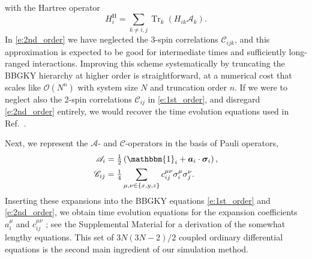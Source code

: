 \documentclass[aps,prl,showpacs,amsmath,amssymb,superscriptaddress,reprint,10pt]{revtex4-1}
\newcommand\id{{\mathbbm{1}}}
\newcommand{\mvec}[1]{\boldsymbol #1}
\DeclareMathOperator{\Tr}{{Tr}}
\begin{document}
with the Hartree operator
\begin{equation}
 H_i^\text{H}=\sum_{k\neq i,j}\Tr_k\left(H_{ik} \mathscr{A}_k\right).
\end{equation}
In \eqref{e:2nd_order} we have neglected the 3-spin correlations $\mathscr{C}_{ijk}$, and this approximation is expected to be good for intermediate times and sufficiently long-ranged interactions. Improving this scheme systematically by truncating the BBGKY hierarchy at higher order is straightforward, at a numerical cost that scales like $\mathscr{O}\left(N^n\right)$ with system size $N$ and truncation order $n$. If we were to neglect also the 2-spin correlations $\mathscr{C}_{ij}$ in \eqref{e:1st_order}, and disregard \eqref{e:2nd_order} entirely, we would recover the time evolution equations used in Ref.~\cite{Schachenmayer_etal15}.

Next, we represent the $\mathscr{A}$- and $\mathscr{C}$-operators in the basis of Pauli operators,
\begin{subequations}
\begin{align}
\mathscr{A}_i &= \tfrac{1}{2}\left(\id_i+\mvec{a}_i\cdot\mvec{\sigma}_i\right),\label{e:Aexp}\\
\mathscr{C}_{ij} &= \tfrac{1}{4}\sum_{\mu,\nu\in\{x,y,z\}}c_{ij}^{\mu\nu}\sigma_i^\mu\sigma_j^\nu.\label{e:Cexp}
\end{align}
\end{subequations}
Inserting these expansions into the BBGKY equations \eqref{e:1st_order} and \eqref{e:2nd_order}, we obtain time evolution equations for the expansion coefficients $a_i^\mu$ and $c_{ij}^{\mu\nu}$ \cite{PaskauskasKastner12}; see the Supplemental Material for a derivation of the somewhat lengthy equations. This set of $3N(3N-2)/2$ coupled ordinary differential equations is the second main ingredient of our simulation method.
\end{document}

